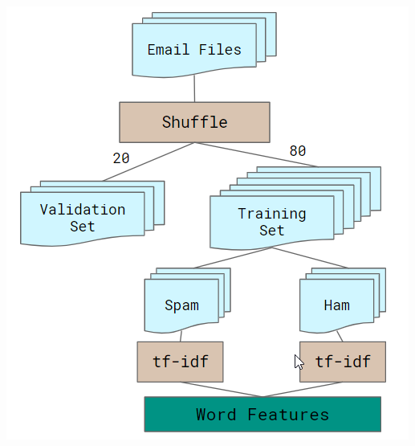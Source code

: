 \documentclass[12pt]{article}
\newenvironment{Figure}
  {\par\medskip\noindent\minipage{\linewidth}}
  {\endminipage\par\medskip}
\begin{document}
\begin{multicols}{2}
            \begin{Figure}
                \centering
                \includegraphics[width=\linewidth]{figures/extract.png}
                \label{fig:extrac}
            \end{Figure}
            

\end{multicols}
\end{document}
